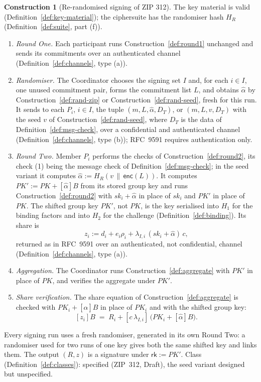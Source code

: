 \documentclass[11pt,a4paper]{article}
\theoremstyle{definition}
\newtheorem{construction}[theorem]{Construction}
\newcommand{\rk}{\mathsf{rk}}
\begin{document}
\begin{construction}[Re-randomised signing of ZIP 312]\label{def:rr-rounds}
The key material is valid (Definition~\ref{def:key-material}); the
ciphersuite has the randomiser hash \(H_R\) (Definition~\ref{def:suite},
part (f)).
\begin{enumerate}[label=(\arabic*)]
\item \emph{Round One.} Each participant runs Construction~\ref{def:round1}
  unchanged and sends its commitments over an authenticated channel
  (Definition~\ref{def:channels}, type (a)).
\item \emph{Randomiser.} The Coordinator chooses the signing set \(I\) and,
  for each \(i \in I\), one unused commitment pair, forms the commitment
  list \(L\), and obtains \(\hat{\alpha}\) by
  Construction~\ref{def:rand-zip} or Construction~\ref{def:rand-seed},
  fresh for this run. It sends to each \(P_i\), \(i \in I\), the tuple
  \((m, L, \hat{\alpha}, D_T)\), or \((m, L, v, D_T)\) with the seed \(v\)
  of Construction~\ref{def:rand-seed}, where \(D_T\) is the data of
  Definition~\ref{def:msg-check}, over a confidential and authenticated
  channel (Definition~\ref{def:channels}, type (b)); RFC~9591 requires
  authentication only.
\item \emph{Round Two.} Member \(P_i\) performs the checks of
  Construction~\ref{def:round2}, its check (1) being the message check of
  Definition~\ref{def:msg-check}; in the seed variant it computes
  \(\hat{\alpha} := H_R(v \,\|\, \mathsf{enc}(L))\). It computes
  \(\mathit{PK}' := \mathit{PK} + [\hat{\alpha}]B\) from its stored group
  key and runs Construction~\ref{def:round2} with
  \(\mathit{sk}_i + \hat{\alpha}\) in place of \(\mathit{sk}_i\) and
  \(\mathit{PK}'\) in place of \(\mathit{PK}\). The shifted group key
  \(\mathit{PK}'\), not \(\mathit{PK}\), is the key serialised into \(H_1\)
  for the binding factors and into \(H_2\) for the challenge
  (Definition~\ref{def:binding}). Its share is
  \[
    z_i := d_i + e_i \rho_i
      + \lambda_{I,i}\,(\mathit{sk}_i + \hat{\alpha})\, c ,
  \]
  returned as in RFC~9591 over an authenticated, not confidential, channel
  (Definition~\ref{def:channels}, type (a)).
\item \emph{Aggregation.} The Coordinator runs
  Construction~\ref{def:aggregate} with \(\mathit{PK}'\) in place of
  \(\mathit{PK}\), and verifies the aggregate under \(\mathit{PK}'\).
\item \emph{Share verification.} The share equation of
  Construction~\ref{def:aggregate} is checked with
  \(\mathit{PK}_i + [\hat{\alpha}]B\) in place of \(\mathit{PK}_i\) and with
  the shifted group key:
  \[
    [z_i]B \;=\; R_i + [c\, \lambda_{I,i}]\,
      \bigl(\mathit{PK}_i + [\hat{\alpha}]B\bigr) .
  \]
\end{enumerate}
Every signing run uses a fresh randomiser, generated in its own Round Two:
a randomiser used for two runs of one key gives both the same shifted key
and links them. The output \((R, z)\) is a signature under
\(\rk := \mathit{PK}'\). Class (Definition~\ref{def:classes}): specified
(ZIP~312, Draft), the seed variant designed but unspecified.
\end{construction}
\end{document}
